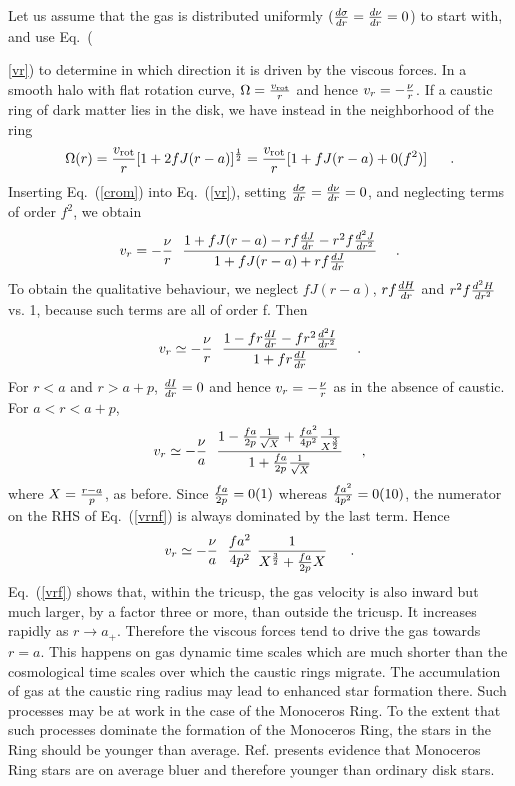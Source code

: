 \documentclass[aps,prd,preprint,tightenlines,floatfix,showpacs,groupedaddress]{revtex4}
\begin{document}
Let us assume that the gas is distributed uniformly 
$({d \sigma \over dr} = {d \nu \over dr} = 0$) to 
start with, and use Eq.~({\ref{vr}) to determine in 
which direction it is driven by the viscous forces.  
In a smooth halo with flat rotation curve, 
$\Omega = {v_{\rm rot} \over r}$ and hence 
$v_r = - {\nu \over r}$.  If a caustic ring 
of dark matter lies in the disk, we have instead 
in the neighborhood of the ring
\begin{equation}
\Omega(r) = {v_{\rm rot} \over r} [1 + 2 f J(r-a)]^{1 \over 2}
= {v_{\rm rot} \over r} [1 + f J(r-a) + 0(f^2)]~~~~\ .
\label{crom}
\end{equation}
Inserting Eq.~(\ref{crom}) into Eq.~(\ref{vr}), setting 
${d \sigma \over dr} = {d \nu \over dr} = 0$, and neglecting 
terms of order $f^2$, we obtain
\begin{equation}
v_r = - {\nu \over r}~~
{1 + f J(r-a) - r f {dJ \over dr} - r^2 f {d^2 J \over dr^2} \over 
1 + f J(r-a) + r f {dJ \over dr}}~~~ \ .
\label{crvr}
\end{equation}
To obtain the qualitative behaviour, we neglect 
$f J(r-a)$, $r f {dH \over dr}$ and $r^2 f {d^2 H \over dr^2}$
vs. 1, because such terms are all of order f.  Then
\begin{equation}
v_r \simeq - {\nu \over r}~~ 
{1 - f r {dI \over dr} - f r^2 {d^2 I \over dr^2} \over 
1 + f r {dI \over dr}}~~~\ .
\label{avr}
\end{equation}
For $r < a$ and $r > a+p$, ${d I \over dr} =0$ and hence 
$v_r  = - {\nu \over r}$ as in the absence of caustic.  For
$a < r < a+p$, 
\begin{equation}
v_r \simeq - {\nu \over a}~~ 
{1 - {fa \over 2p} {1 \over \sqrt{X}} + 
{f a^2 \over 4 p^2} {1 \over X^{3 \over 2}} \over 
1 + {fa \over 2p} {1 \over \sqrt{X}}}~~~\ ,
\label{vrnf}
\end{equation}
where $X = {r-a \over p}$, as before.  Since ${fa \over 2p} = 0(1)$
whereas ${fa^2 \over 4 p^2} = 0(10)$, the numerator on the RHS of 
Eq.~(\ref{vrnf}) is always dominated by the last term.  Hence
\begin{equation}
v_r \simeq - {\nu \over a}~~{f a^2 \over 4 p^2}~
{1 \over X^{3 \over 2} + {fa \over 2p} X}~~~~\ .
\label{vrf}
\end{equation}
Eq.~(\ref{vrf}) shows that, within the tricusp, the gas velocity 
is also inward but much larger, by a factor three or more, than 
outside the tricusp.  It increases rapidly as $r \rightarrow a_+$.
Therefore the viscous forces tend to drive the gas towards $r=a$.
This happens on gas dynamic time scales which are much shorter 
than the cosmological time scales over which the caustic rings 
migrate.  The accumulation of gas at the caustic ring radius 
may lead to enhanced star formation there.  Such processes 
may be at work in the case of the Monoceros Ring.  To the 
extent that such processes dominate the formation of the 
Monoceros Ring, the stars in the Ring should be younger
than average.  Ref. \cite{Mart06} presents evidence that 
Monoceros Ring stars are on average bluer and therefore 
younger than ordinary disk stars. 

}
\end{document}
